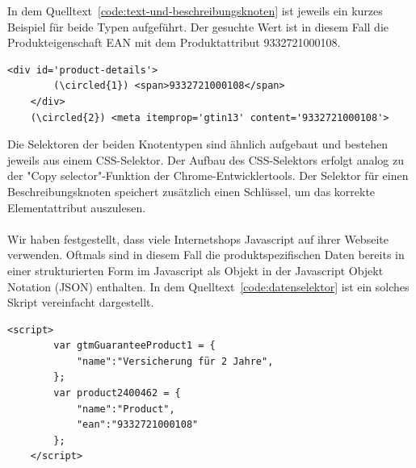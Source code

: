 In dem Quelltext~\ref{code:text-und-beschreibungsknoten} ist jeweils ein kurzes Beispiel für beide Typen aufgeführt.
Der gesuchte Wert ist in diesem Fall die Produkteigenschaft EAN mit dem Produktattribut 9332721000108.
\vspace{0.25cm}
\begin{lstlisting}[label={code:text-und-beschreibungsknoten}]
    <div id='product-details'>
        (\circled{1}) <span>9332721000108</span>
    </div>
    (\circled{2}) <meta itemprop='gtin13' content='9332721000108'>
\end{lstlisting}
\vspace{-0.25cm}
\vspace{0.25cm}
Die Selektoren der beiden Knotentypen sind ähnlich aufgebaut und bestehen jeweils aus einem CSS-Selektor.
Der Aufbau des CSS-Selektors erfolgt analog zu der "Copy selector"-Funktion der Chrome-Entwicklertools.
Der Selektor für einen Beschreibungsknoten speichert zusätzlich einen Schlüssel, um das korrekte Elementattribut
auszulesen.
\\
~\\
Wir haben festgestellt, dass viele Internetshops Javascript auf ihrer Webseite verwenden.
Oftmals sind in diesem Fall die produktspezifischen Daten bereits in einer strukturierten Form im Javascript
als Objekt in der Javascript Objekt Notation (JSON) enthalten.
In dem Quelltext~\ref{code:datenselektor} ist ein solches Skript vereinfacht dargestellt.
\vspace{0.25cm}
\begin{lstlisting}[label={code:datenselektor}]
    <script>
        var gtmGuaranteeProduct1 = {
            "name":"Versicherung für 2 Jahre",
        };
        var product2400462 = {
            "name":"Product",
            "ean":"9332721000108"
        };
    </script>
\end{lstlisting}
\vspace{-0.25cm}
\vspace{0.25cm}

